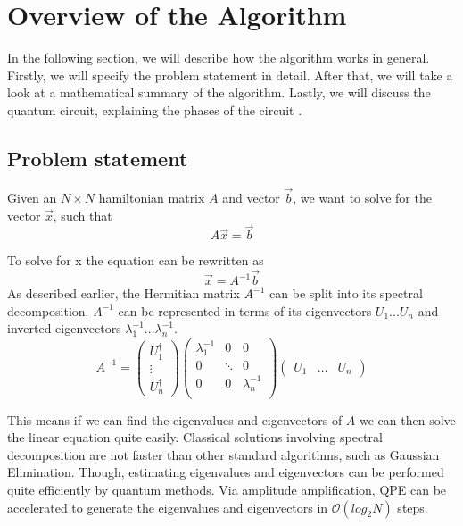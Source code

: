 \section{ Overview of the Algorithm}
In the following section, we will describe how the algorithm works in general.
Firstly, we will specify the problem statement in detail.
After that, we will take a look at a mathematical summary of the algorithm. 
Lastly, we will discuss the quantum circuit, explaining the phases of the circuit \cite{qiskit_hhl}\cite{primer}.

\subsection{Problem statement}

Given an $N\times N$ hamiltonian matrix $A$ and vector $\vec b$, we want to solve for the vector $\vec x$, such that
\begin{equation}
A \vec{x} = \vec{b}
\end{equation}

To solve for x the equation can be rewritten as
\begin{equation}
\vec{x} = A^{-1}\vec{b}
\end{equation}
As described earlier, the Hermitian matrix $A^{-1}$ can be split into its spectral decomposition. 
$A^{-1}$ can be represented in terms of its eigenvectors $U_1 ... U_n$ and inverted eigenvectors $\lambda_1^{-1 } ... \lambda_n^{-1}$.
\begin{equation} 
 A^{-1} = \begin{pmatrix} U^\dagger_1 \\ \vdots \\ U^\dagger_n \end{pmatrix}
\begin{pmatrix} \lambda_1^{-1} & 0 & 0\\ 0 & \ddots & 0\\ 0 & 0& \lambda_n^{-1} \\ \end{pmatrix}
\begin{pmatrix} U_1 & \dots & U_n \end{pmatrix} 
\end{equation}

This means if we can find the eigenvalues and eigenvectors of $A$ we can then solve the linear equation quite easily. 
Classical solutions involving spectral decomposition are not faster than other standard algorithms, such as Gaussian Elimination. 
Though, estimating eigenvalues and eigenvectors can be performed quite efficiently by quantum methods.
Via amplitude amplification, QPE can be accelerated to generate the eigenvalues and eigenvectors in $\mathcal{O}(log_2 N)$ steps.

